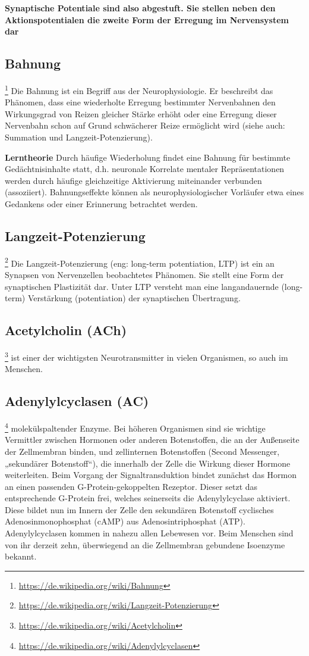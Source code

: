 \textbf{Synaptische Potentiale sind also abgestuft. Sie stellen neben den Aktionspotentialen die zweite Form der Erregung im Nervensystem dar}

\subsection{Bahnung}\footnote{\url{https://de.wikipedia.org/wiki/Bahnung}}
Die Bahnung ist ein Begriff aus der Neurophysiologie. Er beschreibt das Phänomen, dass eine wiederholte Erregung bestimmter Nervenbahnen den Wirkungsgrad von Reizen gleicher Stärke erhöht oder eine Erregung dieser Nervenbahn schon auf Grund schwächerer Reize ermöglicht wird (siehe auch: Summation und Langzeit-Potenzierung).

\textbf{Lerntheorie}
Durch häufige Wiederholung findet eine Bahnung für bestimmte Gedächtnisinhalte statt, d.h. neuronale Korrelate mentaler Repräsentationen werden durch häufige gleichzeitige Aktivierung miteinander verbunden (assoziiert). Bahnungseffekte können als neurophysiologischer Vorläufer etwa eines Gedankens oder einer Erinnerung betrachtet werden.

\subsection{Langzeit-Potenzierung}\footnote{\url{https://de.wikipedia.org/wiki/Langzeit-Potenzierung}}
Die Langzeit-Potenzierung (eng: long-term potentiation, LTP) ist ein an Synapsen von Nervenzellen beobachtetes Phänomen. Sie stellt eine Form der synaptischen Plastizität dar. Unter LTP versteht man eine langandauernde (long-term) Verstärkung (potentiation) der synaptischen Übertragung.

\subsection{Acetylcholin (ACh)}\footnote{\url{https://de.wikipedia.org/wiki/Acetylcholin}}
ist einer der wichtigsten Neurotransmitter in vielen Organismen, so auch im Menschen.

\subsection{Adenylylcyclasen (AC)}\footnote{\url{https://de.wikipedia.org/wiki/Adenylylcyclasen}}
molekülspaltender Enzyme. Bei höheren Organismen sind sie wichtige Vermittler zwischen Hormonen oder anderen Botenstoffen, die an der Außenseite der Zellmembran binden, und zellinternen Botenstoffen (Second Messenger, „sekundärer Botenstoff“), die innerhalb der Zelle die Wirkung dieser Hormone weiterleiten. Beim Vorgang der Signaltransduktion bindet zunächst das Hormon an einen passenden G-Protein-gekoppelten Rezeptor. Dieser setzt das entsprechende G-Protein frei, welches seinerseits die Adenylylcyclase aktiviert. Diese bildet nun im Innern der Zelle den sekundären Botenstoff cyclisches Adenosinmonophosphat (cAMP) aus Adenosintriphosphat (ATP). Adenylylcyclasen kommen in nahezu allen Lebewesen vor. Beim Menschen sind von ihr derzeit zehn, überwiegend an die Zellmembran gebundene Isoenzyme bekannt.

